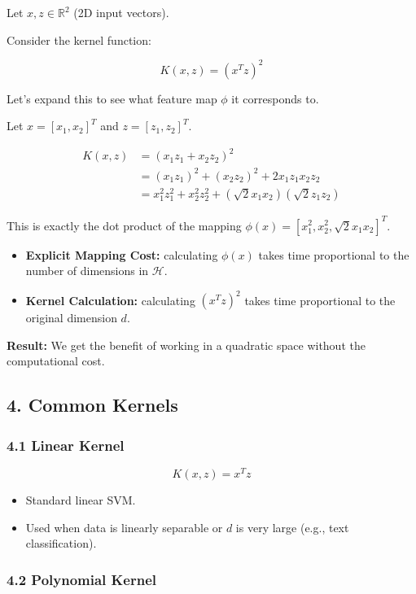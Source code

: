 \documentclass[
  italian,
  11pt,
]{article}
\begin{document}
Let \(x, z \in \mathbb{R}^2\) (2D input vectors).

Consider the kernel function:

\[K(x, z) = (x^T z)^2\]

Let's expand this to see what feature map \(\phi\) it corresponds to.

Let \(x = [x_1, x_2]^T\) and \(z = [z_1, z_2]^T\).

\[\begin{aligned} K(x, z) &= (x_1 z_1 + x_2 z_2)^2 \\ &= (x_1 z_1)^2 + (x_2 z_2)^2 + 2 x_1 z_1 x_2 z_2 \\ &= x_1^2 z_1^2 + x_2^2 z_2^2 + (\sqrt{2} x_1 x_2)(\sqrt{2} z_1 z_2) \end{aligned}\]

This is exactly the dot product of the mapping
\(\phi(x) = [x_1^2, x_2^2, \sqrt{2} x_1 x_2]^T\).

\begin{itemize}
\item
  \textbf{Explicit Mapping Cost:} calculating \(\phi(x)\) takes time
  proportional to the number of dimensions in \(\mathcal{H}\).
\item
  \textbf{Kernel Calculation:} calculating \((x^T z)^2\) takes time
  proportional to the original dimension \(d\).
\end{itemize}

\textbf{Result:} We get the benefit of working in a quadratic space
without the computational cost.

\subsection{4. Common Kernels}\label{common-kernels}

\subsubsection{4.1 Linear Kernel}\label{linear-kernel}

\[K(x, z) = x^T z\]

\begin{itemize}
\item
  Standard linear SVM.
\item
  Used when data is linearly separable or \(d\) is very large (e.g.,
  text classification).
\end{itemize}

\subsubsection{4.2 Polynomial Kernel}\label{polynomial-kernel}
\end{document}
